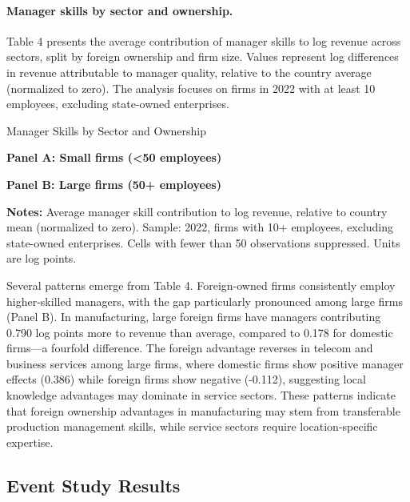 \documentclass[11pt,a4paper]{article}
\begin{document}
\paragraph{Manager skills by sector and ownership.} Table 4 presents the average contribution of manager skills to log revenue across sectors, split by foreign ownership and firm size. Values represent log differences in revenue attributable to manager quality, relative to the country average (normalized to zero). The analysis focuses on firms in 2022 with at least 10 employees, excluding state-owned enterprises.

\begin{table}[htbp]
\centering
\caption{Manager Skills by Sector and Ownership}
\label{tab:manager_skills}
\begin{minipage}{0.45\textwidth}
\centering
\textbf{Panel A: Small firms (<50 employees)}

\end{minipage}
\hfill
\begin{minipage}{0.45\textwidth}
\centering
\textbf{Panel B: Large firms (50+ employees)}

\end{minipage}
\begin{tablenotes}[flushleft]
\footnotesize
\item\textbf{Notes:} Average manager skill contribution to log revenue, relative to country mean (normalized to zero). Sample: 2022, firms with 10+ employees, excluding state-owned enterprises. Cells with fewer than 50 observations suppressed. Units are log points.
\end{tablenotes}
\end{table}

Several patterns emerge from Table 4. Foreign-owned firms consistently employ higher-skilled managers, with the gap particularly pronounced among large firms (Panel B). In manufacturing, large foreign firms have managers contributing 0.790 log points more to revenue than average, compared to 0.178 for domestic firms—a fourfold difference. The foreign advantage reverses in telecom and business services among large firms, where domestic firms show positive manager effects (0.386) while foreign firms show negative (-0.112), suggesting local knowledge advantages may dominate in service sectors. These patterns indicate that foreign ownership advantages in manufacturing may stem from transferable production management skills, while service sectors require location-specific expertise.

\subsection{Event Study Results}
\end{document}
